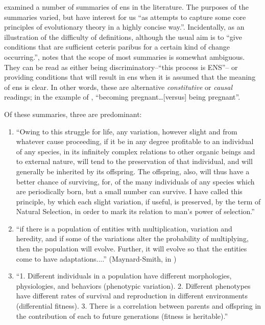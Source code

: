 \cite{Godfrey-Smith2007} examined a number of summaries of \gls{ens} in the literature. The purposes of the summaries varied, but have interest for us ``as attempts to capture some core principles of evolutionary theory in a highly concise way.''. Incidentally, as an illustration of the difficulty of definitions, although the usual aim is to ``give conditions that are sufficient ceteris paribus for a certain kind of change occurring.'', \cite{Godfrey-Smith2007} notes that the scope of most summaries is somewhat ambiguous. They can be read as either being discriminatory--``this process is ENS''-- or providing conditions that will result in \gls{ens} when it is assumed that the meaning of \gls{ens} is clear. In other words, these are alternative \emph{constitutive} or \emph{causal} readings; in the example of \cite{Godfrey-Smith2007}, ``becoming pregnant\ldots{}{[}versus{]} being pregnant''.

Of these summaries, three are predominant:

\begin{enumerate}
\item
``Owing to this struggle for life, any variation, however slight and from whatever cause proceeding, if it be in any degree profitable to an individual of any species, in its infinitely complex relations to other organic beings and to external nature, will tend to the preservation of that individual, and will generally be inherited by its offspring. The offspring, also, will thus have a better chance of surviving, for, of the many individuals of any species which are periodically born, but a small number can survive. I have called this principle, by which each slight variation, if useful, is preserved, by the term of Natural Selection, in order to mark its relation to man's power of selection.'' \cite{Darwin1859}

\item
``if there is a population of entities with multiplication, variation and heredity, and if some of the variations alter the probability of multiplying, then the population will evolve. Further, it will evolve so that the entities come to have adaptations....'' (Maynard-Smith, in \cite{Griesemer2001})

\item
``1. Different individuals in a population have different morphologies, physiologies, and behaviors (phenotypic variation). 2. Different phenotypes have different rates of survival and reproduction in different environments (differential fitness). 3. There is a correlation between parents and offspring in the contribution of each to future generations (fitness is heritable).'' \cite{Lewontin:1970mc}

\end{enumerate}

